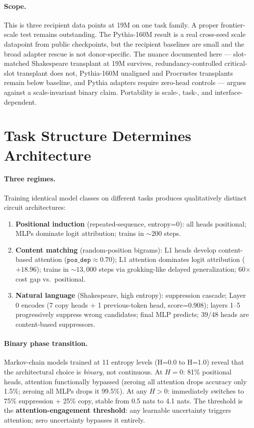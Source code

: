 \documentclass[final]{article}
\begin{document}
\paragraph{Scope.}
This is three recipient data points at 19M on one task family. A proper
frontier-scale test remains outstanding. The Pythia-160M result is a real
cross-seed scale datapoint from public checkpoints, but the recipient baselines are small
and the broad adapter rescue is not donor-specific. The nuance documented here
--- slot-matched Shakespeare transplant at 19M survives, redundancy-controlled
critical-slot transplant does not, Pythia-160M unaligned and Procrustes
transplants remain below baseline, and Pythia adapters require zero-head
controls --- argues against a scale-invariant binary claim. Portability is
scale-, task-, and interface-dependent.

\section{Task Structure Determines Architecture}
\label{sec:taskarch}

\paragraph{Three regimes.}
Training identical model classes on different tasks produces qualitatively
distinct circuit architectures:

\begin{enumerate}
\item \textbf{Positional induction} (repeated-sequence, entropy=0): all heads
      positional; MLPs dominate logit attribution; trains in ${\sim}200$ steps.
\item \textbf{Content matching} (random-position bigrams): L1 heads
      develop content-based attention ($\mathtt{pos\_dep} \approx 0.70$); L1
      attention dominates logit attribution ($+18.96$); trains in ${\sim}13{,}000$
      steps via grokking-like delayed generalization; 60$\times$ cost gap vs.\
      positional.
\item \textbf{Natural language} (Shakespeare, high entropy): suppression cascade;
      Layer 0 encodes (7 copy heads + 1 previous-token head, score=0.908); layers
      1--5 progressively suppress wrong candidates; final MLP predicts; 39/48
      heads are content-based suppressors.
\end{enumerate}

\paragraph{Binary phase transition.}
Markov-chain models trained at 11 entropy levels (H=0.0 to H=1.0) reveal that
the architectural choice is \emph{binary}, not continuous. At $H=0$: 81\%
positional heads, attention functionally bypassed (zeroing all attention drops
accuracy only 1.5\%; zeroing all MLPs drops it 99.5\%). At any $H > 0$:
immediately switches to 75\% suppression + 25\% copy, stable from 0.5 nats to
4.1 nats. The threshold is the \textbf{attention-engagement threshold}: any
learnable uncertainty triggers attention; zero uncertainty bypasses it entirely.
\end{document}
